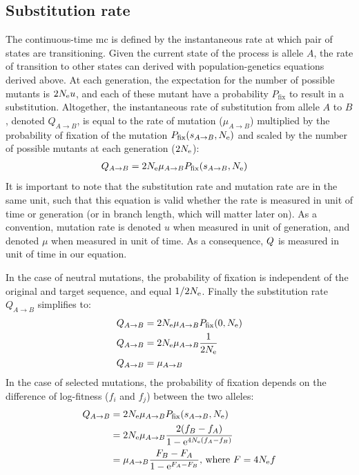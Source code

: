 \subsection{Substitution rate}
The continuous-time \gls{mc} is defined by the instantaneous rate at which pair of states are transitioning.
Given the current state of the process is \gls{allele} $A$, the rate of {transition} to other states can derived with population-genetics equations derived above.
At each generation, the expectation for the number of possible mutants is $2N_{\textrm{e}} u$, and each of these mutant have a probability $P_{\mathrm{fix}}$ to result in a \gls{substitution}.
Altogether, the instantaneous rate of \gls{substitution} from \gls{allele} $A$ to $B$, denoted $Q_{A \to B}$, is equal to the rate of mutation ($\mu_{A \to B}$) multiplied by the probability of fixation of the mutation $P_{\mathrm{fix}}(s_{A \to B}, N_{\textrm{e}})$ and scaled by the number of possible mutants at each generation ($2N_{\textrm{e}}$):
\begin{align}
Q_{A \to B} & = 2 N_{\textrm{e}} \mu_{A \to B}  P_{\mathrm{fix}}(s_{A \to B}, N_{\textrm{e}})
\end{align}
It is important to note that the \gls{substitution} rate and mutation rate are in the same unit, such that this equation is valid whether the rate is measured in unit of time or generation (or in branch length, which will matter later on).
As a convention, mutation rate is denoted $u$ when measured in unit of generation, and denoted $\mu$ when measured in unit of time. As a consequence, $Q$ is measured in unit of time in our equation.

In the case of \gls{neutral} mutations, the probability of fixation is independent of the original and target sequence, and equal $1/2 N_{\textrm{e}}$. Finally the \gls{substitution} rate $Q_{A \to B}$ simplifies to: 
\begin{align}
Q_{A \to B} & = 2 N_{\textrm{e}} \mu_{A \to B}  P_{\mathrm{fix}}(0, N_{\textrm{e}}) \\
Q_{A \to B} & = 2 N_{\textrm{e}} \mu_{A \to B} \dfrac{1}{2N_{\textrm{e}}} \\
Q_{A \to B} & =  \mu_{A \to B} \label{eq:sub-equal-mut}
\end{align}
In the case of selected mutations, the probability of fixation depends on the difference of log-fitness ($f_i$ and $f_j$) between the two \glspl{allele}:
\begin{align}
Q_{A \to B} & = 2 N_{\textrm{e}} \mu_{A \to B} P_{\mathrm{fix}}(s_{A \to B}, N_{\textrm{e}}) \\
			& = 2 N_{\textrm{e}} \mu_{A \to B}  \dfrac{2(f_{B} - f_{A})}{1 - \mathrm{e}^{4N_{\textrm{e}}(f_{A} - f_{B})} } \\
			& = \mu_{A \to B} \dfrac{F_{B} - F_{A}}{1 - \mathrm{e}^{F_{A} - F_{B}} }\text{, where } F = 4N_{\textrm{e}} f \label{eq:sub-transion-rates}
\end{align}

